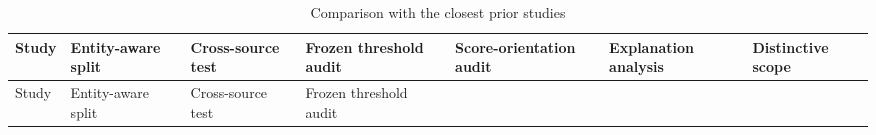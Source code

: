 \documentclass[
  10pt,
]{article}
\begin{document}
\begin{longtable}[]{@{}
  >{\raggedright\arraybackslash}p{}
  >{\raggedright\arraybackslash}p{}
  >{\raggedright\arraybackslash}p{}
  >{\raggedright\arraybackslash}p{}
  >{\raggedright\arraybackslash}p{}
  >{\raggedright\arraybackslash}p{}
  >{\raggedright\arraybackslash}p{}@{}}
\caption{Comparison with the closest prior studies}\tabularnewline
\toprule\noalign{}
\begin{minipage}[b]{\linewidth}\raggedright
Study
\end{minipage} & \begin{minipage}[b]{\linewidth}\raggedright
Entity-aware split
\end{minipage} & \begin{minipage}[b]{\linewidth}\raggedright
Cross-source test
\end{minipage} & \begin{minipage}[b]{\linewidth}\raggedright
Frozen threshold audit
\end{minipage} & \begin{minipage}[b]{\linewidth}\raggedright
Score-orientation audit
\end{minipage} & \begin{minipage}[b]{\linewidth}\raggedright
Explanation analysis
\end{minipage} & \begin{minipage}[b]{\linewidth}\raggedright
Distinctive scope
\end{minipage} \\
\midrule\noalign{}
\endfirsthead
\toprule\noalign{}
\begin{minipage}[b]{\linewidth}\raggedright
Study
\end{minipage} & \begin{minipage}[b]{\linewidth}\raggedright
Entity-aware split
\end{minipage} & \begin{minipage}[b]{\linewidth}\raggedright
Cross-source test
\end{minipage} & \begin{minipage}[b]{\linewidth}\raggedright
Frozen threshold audit
\end{minipage} & \begin{minipage}[b]{\linewidth}\raggedright

\end{minipage}
\end{longtable}
\end{document}
